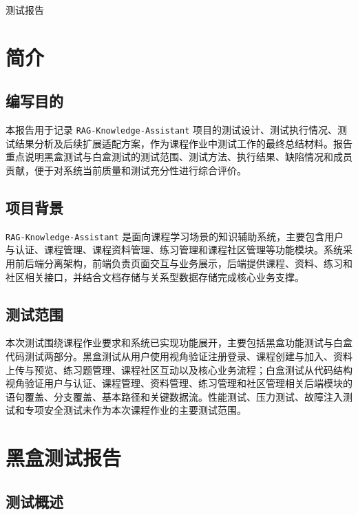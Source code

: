 \documentclass[12pt,a4paper]{ctexart}
\begin{document}
\begin{center}
{\LARGE\heiti 测试报告}
\end{center}

\tableofcontents
\newpage

\section{简介}

\subsection{编写目的}

本报告用于记录 \texttt{RAG-Knowledge-Assistant} 项目的测试设计、测试执行情况、测试结果分析及后续扩展适配方案，作为课程作业中测试工作的最终总结材料。报告重点说明黑盒测试与白盒测试的测试范围、测试方法、执行结果、缺陷情况和成员贡献，便于对系统当前质量和测试充分性进行综合评价。

\subsection{项目背景}

\texttt{RAG-Knowledge-Assistant} 是面向课程学习场景的知识辅助系统，主要包含用户与认证、课程管理、课程资料管理、练习管理和课程社区管理等功能模块。系统采用前后端分离架构，前端负责页面交互与业务展示，后端提供课程、资料、练习和社区相关接口，并结合文档存储与关系型数据存储完成核心业务支撑。

\subsection{测试范围}

本次测试围绕课程作业要求和系统已实现功能展开，主要包括黑盒功能测试与白盒代码测试两部分。黑盒测试从用户使用视角验证注册登录、课程创建与加入、资料上传与预览、练习题管理、课程社区互动以及核心业务流程；白盒测试从代码结构视角验证用户与认证、课程管理、资料管理、练习管理和社区管理相关后端模块的语句覆盖、分支覆盖、基本路径和关键数据流。性能测试、压力测试、故障注入测试和专项安全测试未作为本次课程作业的主要测试范围。

\section{黑盒测试报告}

\subsection{测试概述}
\end{document}
